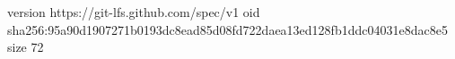 version https://git-lfs.github.com/spec/v1
oid sha256:95a90d1907271b0193dc8ead85d08fd722daea13ed128fb1ddc04031e8dac8e5
size 72
